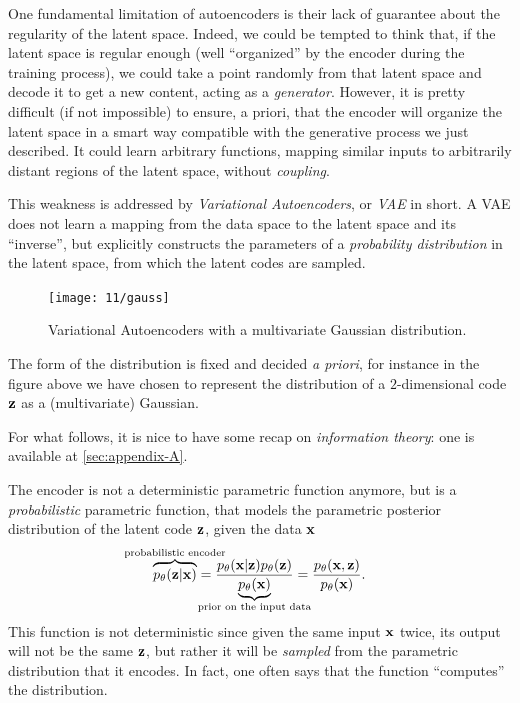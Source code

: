 

One fundamental limitation of autoencoders is their lack of guarantee about the regularity of the latent space.  Indeed, we could be tempted to think that, if the latent space is regular enough (well ``organized'' by the encoder during the training process), we could take a point randomly from that latent space and decode it to get a new content, acting as a \emph{generator}. However, it is pretty difficult (if not impossible) to ensure, a priori, that the encoder will organize the latent space in a smart way compatible with the generative process we just described. It could learn arbitrary functions, mapping similar inputs to arbitrarily distant regions of the latent space, without \emph{coupling}.

This weakness is addressed by \emph{Variational Autoencoders}, or \emph{VAE} in short. A VAE does not learn a mapping from the data space to the latent space and its ``inverse'', but explicitly constructs the parameters of a \emph{probability distribution} in the latent space, from which the latent codes are sampled.
\begin{figure}[H]
	\centering
	\texttt{[image: 11/gauss]}
	\caption{Variational Autoencoders with a multivariate Gaussian distribution.}\label{fig:gauss_variationalAE}	
\end{figure}
The form of the distribution is fixed and decided \emph{a priori}, for instance in the figure above we have chosen to represent the distribution of a $2$-dimensional code $\vb{z}$ as a (multivariate) Gaussian.
 
For what follows, it is nice to have some recap on \emph{information theory}: one is available at \cref{sec:appendix-A}.

The encoder is not a deterministic parametric function anymore, but is a \emph{probabilistic} parametric function, that models the parametric posterior distribution of the latent code $\vb{z}$, given the data $\vb{x}$
\begin{equation}
    \overbrace{p_\mathbf{\theta}(\mathbf{z} | \mathbf{x})}^{\mathclap{\text{probabilistic encoder}}} = \frac{p_\mathbf{\theta}(\mathbf{x} | \mathbf{z})p_\mathbf{\theta}(\mathbf{z})}{\underbrace{p_\mathbf{\theta}(\mathbf{x})}_{\mathclap{\text{prior on the input data}}}} = \frac{p_\mathbf{\theta}(\mathbf{x}, \mathbf{z})}{p_\mathbf{\theta}(\mathbf{x})}.
    \label{eq:prob_enc}
\end{equation}
This function is not deterministic since given the same input $\vb{x}$ twice, its output will not be the same $\vb{z}$, but rather it will be \emph{sampled} from the parametric distribution that it encodes. In fact, one often says that the function ``computes'' the distribution.

